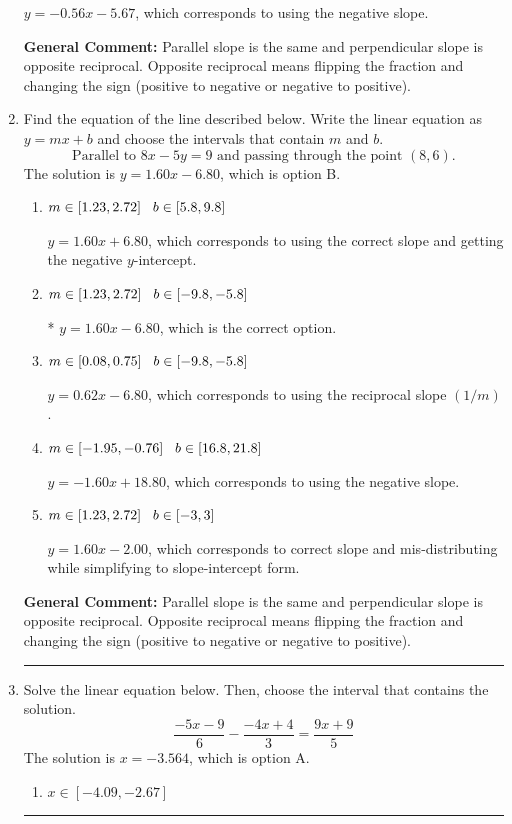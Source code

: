 \documentclass{extbook}[14pt]
\newcommand{\litem}[1]{\item #1

\rule{\textwidth}{0.4pt}}
\begin{document}
\begin{enumerate}
{\begin{enumerate}[label=\Alph*.]
 $y = -0.56x - 5.67$, which corresponds to using the negative slope.
\end{enumerate}

\textbf{General Comment:} Parallel slope is the same and perpendicular slope is opposite reciprocal. Opposite reciprocal means flipping the fraction and changing the sign (positive to negative or negative to positive).
}
\litem{
Find the equation of the line described below. Write the linear equation as $ y=mx+b $ and choose the intervals that contain $m$ and $b$.
\[ \text{Parallel to } 8 x - 5 y = 9 \text{ and passing through the point } (8, 6). \]
The solution is \( y = 1.60x - 6.80 \), which is option B.\begin{enumerate}[label=\Alph*.]
\item \( m \in [1.23, 2.72] \hspace*{3mm} b \in [5.8, 9.8] \)

 $y = 1.60x + 6.80$, which corresponds to using the correct slope and getting the negative $y$-intercept.
\item \( m \in [1.23, 2.72] \hspace*{3mm} b \in [-9.8, -5.8] \)

* $y = 1.60x - 6.80$, which is the correct option.
\item \( m \in [0.08, 0.75] \hspace*{3mm} b \in [-9.8, -5.8] \)

 $y = 0.62x - 6.80$, which corresponds to using the reciprocal slope $(1/m)$.
\item \( m \in [-1.95, -0.76] \hspace*{3mm} b \in [16.8, 21.8] \)

 $y = -1.60x + 18.80$, which corresponds to using the negative slope.
\item \( m \in [1.23, 2.72] \hspace*{3mm} b \in [-3, 3] \)

 $y = 1.60x - 2.00$, which corresponds to correct slope and mis-distributing while simplifying to slope-intercept form.
\end{enumerate}

\textbf{General Comment:} Parallel slope is the same and perpendicular slope is opposite reciprocal. Opposite reciprocal means flipping the fraction and changing the sign (positive to negative or negative to positive).
}
\litem{
Solve the linear equation below. Then, choose the interval that contains the solution.
\[ \frac{-5x -9}{6} - \frac{-4x + 4}{3} = \frac{9x + 9}{5} \]
The solution is \( x = -3.564 \), which is option A.\begin{enumerate}[label=\Alph*.]
\item \( x \in [-4.09, -2.67] \)


\end{enumerate}}
\end{enumerate}
\end{document}
